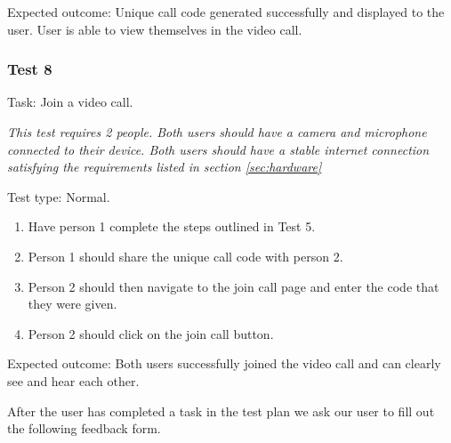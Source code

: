 {\sffamily Expected outcome:} Unique call code generated successfully
and displayed to the user. User is able to view themselves in
the video call.\\

{\color{gray} \hrulefill}

\vspace{0.2cm}

\subsubsection{Test 8}

{\sffamily Task:} Join a video call.\\ \vspace{0.2cm}

\textit{This test requires 2 people. Both users should have a camera
and microphone connected to their device. Both users should have a
stable internet connection satisfying the requirements listed in section \ref{sec:hardware}}\\

{\color{gray} \hrulefill}

{\sffamily Test type: Normal.}\\

\begin{enumerate}
  \item Have person 1 complete the steps outlined in Test 5.
  \item Person 1 should share the unique call code with person 2.
  \item Person 2 should then navigate to the join call page and enter the code that they were given.
  \item Person 2 should click on the join call button.
\end{enumerate}

{\sffamily Expected outcome:} Both users successfully joined the video call
and can clearly see and hear each other.\\

{\color{gray} \hrulefill} \vspace{0.2cm}

After the user has completed a task in the test plan we
ask our user to fill out the following feedback form.



